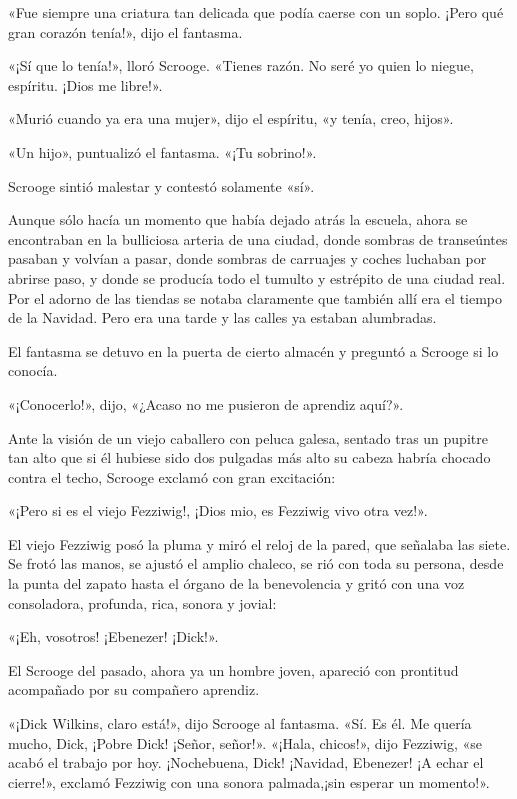 \documentclass{novela}
\begin{document}
 «Fue siempre una criatura tan delicada que podía caerse con un soplo. ¡Pero qué gran corazón tenía!», dijo el fantasma.

 «¡Sí que lo tenía!», lloró Scrooge. «Tienes razón. No seré yo quien lo niegue, espíritu. ¡Dios me libre!».

 «Murió cuando ya era una mujer», dijo el espíritu, «y tenía, creo, hijos».

 «Un hijo», puntualizó el fantasma. «¡Tu sobrino!».

 Scrooge sintió malestar y contestó solamente «sí».

 Aunque sólo hacía un momento que había dejado atrás la escuela, ahora se encontraban en la bulliciosa arteria de una ciudad, donde sombras de transeúntes pasaban y volvían a pasar, donde sombras de carruajes y coches luchaban por abrirse paso, y donde se producía todo el tumulto y estrépito de una ciudad real. Por el adorno de las tiendas se notaba claramente que también allí era el tiempo de la Navidad. Pero era una tarde y las calles ya estaban alumbradas.

 El fantasma se detuvo en la puerta de cierto almacén y preguntó a Scrooge si lo conocía.

 «¡Conocerlo!», dijo, «¿Acaso no me pusieron de aprendiz aquí?».

 Ante la visión de un viejo caballero con peluca galesa, sentado tras un pupitre tan alto que si él hubiese sido dos pulgadas más alto su cabeza habría chocado contra el techo, Scrooge exclamó con gran excitación:

 «¡Pero si es el viejo Fezziwig!, ¡Dios mio, es Fezziwig vivo otra vez!».

 El viejo Fezziwig posó la pluma y miró el reloj de la pared, que señalaba las siete. Se frotó las manos, se ajustó el amplio chaleco, se rió con toda su persona, desde la punta del zapato hasta el órgano de la benevolencia y gritó con una voz consoladora, profunda, rica, sonora y jovial:

 «¡Eh, vosotros! ¡Ebenezer! ¡Dick!».

 El Scrooge del pasado, ahora ya un hombre joven, apareció con prontitud acompañado por su compañero aprendiz.

 «¡Dick Wilkins, claro está!», dijo Scrooge al fantasma. «Sí. Es él. Me quería mucho, Dick, ¡Pobre Dick! ¡Señor, señor!». «¡Hala, chicos!», dijo Fezziwig, «se acabó el trabajo por hoy. ¡Nochebuena, Dick! ¡Navidad, Ebenezer! ¡A echar el cierre!», exclamó Fezziwig con una sonora palmada,¡sin esperar un momento!».
\end{document}
